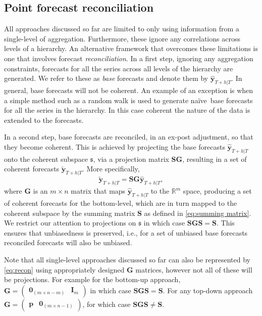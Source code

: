 \documentclass[graybox]{svmult}
\def\naive{na\"{i}ve\ }
\begin{document}
\subsection{Point forecast reconciliation}\label{sec:reconciliation approaches}

All approaches discussed so far are limited to only using information from a single-level of aggregation. Furthermore, these ignore any correlations across levels of a hierarchy. An alternative framework that overcomes these limitations is one that involves forecast \textit{reconciliation}. In a first step, ignoring any aggregation constraints, forecasts for all the series across all levels of the hierarchy are generated. We refer to these as \textit{base} forecasts and denote them by $\hat{\bm{y}}_{T+h|T}$. In general, base forecasts will not be coherent. An example of an exception is when a simple method such as a random walk is used to generate \naive base forecasts for all the series in the hierarchy. In this case coherent the nature of the data is extended to the forecasts.

In a second step, base forecasts are reconciled, in an ex-post adjustment, so that they become coherent. This is achieved by projecting the base forecasts $\hat{\bm{y}}_{T+h|T}$ onto the coherent subspace $\mathfrak{s}$, via a projection matrix $\bm{SG}$, resulting in a set of coherent forecasts $\tilde{\bm{y}}_{T+h|T}$. More specifically,
\begin{equation}\label{eq:recon}
\tilde{\bm{y}}_{T+h|T}=\bm{S}\bm{G}\hat{\bm{y}}_{T+h|T},
\end{equation}
where $\bm{G}$ is an $m\times n$ matrix that maps $\hat{\bm{y}}_{T+h|T}$ to the $\mathbb{R}^m$ space, producing a set of coherent forecasts for the bottom-level, which are in turn mapped to the coherent subspace by the summing matrix $\bm{S}$ as defined in \eqref{eq:summing matrix}. We restrict our attention to projections on $\mathfrak{s}$ in which case $\bm{SGS}=\bm{S}$. This ensures that unbiasedness is preserved, i.e., for a set of unbiased base forecasts reconciled forecasts will also be unbiased.



Note that all single-level approaches discussed so far can also be represented by \eqref{eq:recon} using appropriately designed $\bm{G}$ matrices, however not all of these will be projections. For example for the bottom-up approach, $\bm{G}=\begin{pmatrix}
\bm{0}_{(m \times n-m)} & \bm{I}_m
\end{pmatrix}$ in which case $\bm{SGS}=\bm{S}$. For any top-down approach
$\bm{G}=\begin{pmatrix}
\bm{p} & \bm{0}_{(m \times n-1)}
\end{pmatrix}$, for which case $\bm{SGS}\ne\bm{S}$.
\end{document}
